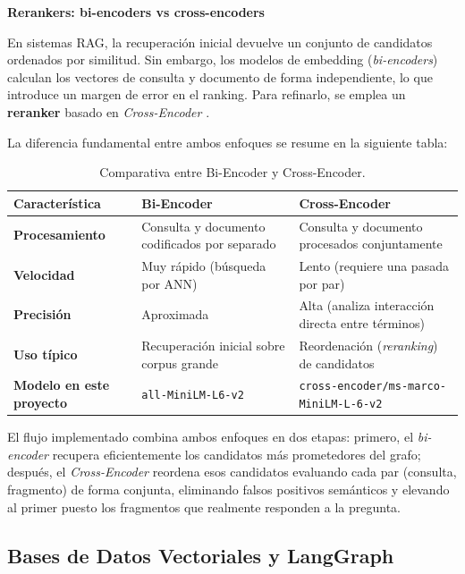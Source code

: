 \vspace{0.3cm}
\textbf{Rerankers: bi-encoders vs cross-encoders}

En sistemas RAG, la recuperación inicial devuelve un conjunto de candidatos ordenados por similitud. Sin embargo, los modelos de embedding (\textit{bi-encoders}) calculan los vectores de consulta y documento de forma independiente, lo que introduce un margen de error en el ranking. Para refinarlo, se emplea un \textbf{reranker} basado en \textit{Cross-Encoder} \cite{Reimers2019}.

La diferencia fundamental entre ambos enfoques se resume en la siguiente tabla:

\begin{table}[H]
\centering
\renewcommand{\arraystretch}{1.4}
\caption{Comparativa entre Bi-Encoder y Cross-Encoder.}
\label{tab:biencoder_crossencoder}
\begin{tabularx}{\textwidth}{|l|X|X|}
\hline
\textbf{Característica} & \textbf{Bi-Encoder} & \textbf{Cross-Encoder} \\
\hline
\textbf{Procesamiento} & Consulta y documento codificados por separado & Consulta y documento procesados conjuntamente \\
\hline
\textbf{Velocidad} & Muy rápido (búsqueda por ANN) & Lento (requiere una pasada por par) \\
\hline
\textbf{Precisión} & Aproximada & Alta (analiza interacción directa entre términos) \\
\hline
\textbf{Uso típico} & Recuperación inicial sobre corpus grande & Reordenación (\textit{reranking}) de candidatos \\
\hline
\textbf{Modelo en este proyecto} & \texttt{all-MiniLM-L6-v2} & \nolinkurl{cross-encoder/ms-marco-MiniLM-L-6-v2} \\
\hline
\end{tabularx}
\end{table}

El flujo implementado combina ambos enfoques en dos etapas: primero, el \textit{bi-encoder} recupera eficientemente los candidatos más prometedores del grafo; después, el \textit{Cross-Encoder} reordena esos candidatos evaluando cada par (consulta, fragmento) de forma conjunta, eliminando falsos positivos semánticos y elevando al primer puesto los fragmentos que realmente responden a la pregunta.

\newpage
\subsection{Bases de Datos Vectoriales y LangGraph}


